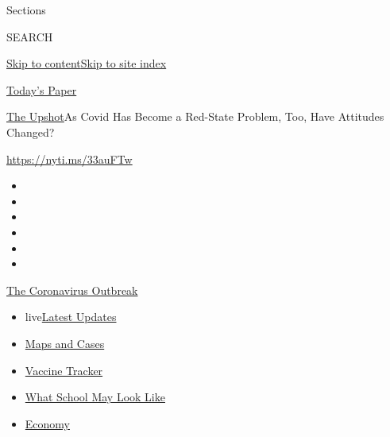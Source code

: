 Sections

SEARCH

\protect\hyperlink{site-content}{Skip to
content}\protect\hyperlink{site-index}{Skip to site index}

\href{https://myaccount.nytimes.com/auth/login?response_type=cookie\&client_id=vi}{}

\href{https://www.nytimes.com/section/todayspaper}{Today's Paper}

\href{/section/upshot}{The Upshot}\textbar{}As Covid Has Become a
Red-State Problem, Too, Have Attitudes Changed?

\url{https://nyti.ms/33auFTw}

\begin{itemize}
\item
\item
\item
\item
\item
\item
\end{itemize}

\href{https://www.nytimes.com/news-event/coronavirus?action=click\&pgtype=Article\&state=default\&region=TOP_BANNER\&context=storylines_menu}{The
Coronavirus Outbreak}

\begin{itemize}
\tightlist
\item
  live\href{https://www.nytimes.com/2020/08/01/world/coronavirus-covid-19.html?action=click\&pgtype=Article\&state=default\&region=TOP_BANNER\&context=storylines_menu}{Latest
  Updates}
\item
  \href{https://www.nytimes.com/interactive/2020/us/coronavirus-us-cases.html?action=click\&pgtype=Article\&state=default\&region=TOP_BANNER\&context=storylines_menu}{Maps
  and Cases}
\item
  \href{https://www.nytimes.com/interactive/2020/science/coronavirus-vaccine-tracker.html?action=click\&pgtype=Article\&state=default\&region=TOP_BANNER\&context=storylines_menu}{Vaccine
  Tracker}
\item
  \href{https://www.nytimes.com/interactive/2020/07/29/us/schools-reopening-coronavirus.html?action=click\&pgtype=Article\&state=default\&region=TOP_BANNER\&context=storylines_menu}{What
  School May Look Like}
\item
  \href{https://www.nytimes.com/live/2020/07/31/business/stock-market-today-coronavirus?action=click\&pgtype=Article\&state=default\&region=TOP_BANNER\&context=storylines_menu}{Economy}
\end{itemize}

